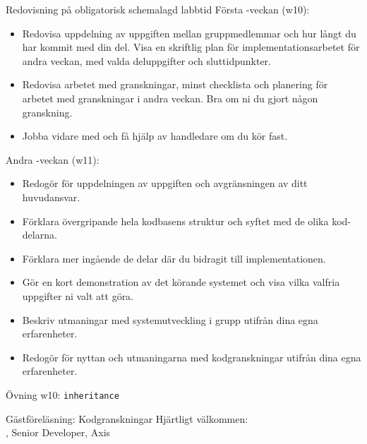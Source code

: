 \begin{Slide}{Redovisning på obligatorisk schemalagd labbtid}
Första -veckan (w10):
\begin{itemize}\SlideFontTiny
\item Redovisa uppdelning av uppgiften mellan gruppmedlemmar och hur långt du har kommit med din del. Visa en skriftlig plan för implementationsarbetet för andra veckan, med valda deluppgifter och sluttidpunkter.
\item Redovisa arbetet med granskningar, minst checklista och planering för arbetet med granskningar i andra veckan. Bra om ni du gjort någon granskning.
\item Jobba vidare med  och få hjälp av handledare om du kör fast. 
\end{itemize}
Andra -veckan (w11):
\begin{itemize}\SlideFontTiny
\item Redogör för uppdelningen av uppgiften och avgränsningen av ditt huvudansvar.
\item Förklara övergripande hela kodbasens struktur och syftet med de olika kod-delarna.
\item Förklara mer ingående de delar där du bidragit till implementationen.
\item Gör en kort demonstration av det körande systemet och visa vilka valfria uppgifter ni valt att göra.
\item Beskriv utmaningar med systemutveckling i grupp utifrån dina egna erfarenheter.
\item Redogör för nyttan och utmaningarna med kodgranskningar utifrån dina egna erfarenheter.  
\end{itemize}
\end{Slide}

\begin{Slide}{Övning w10: \texttt{inheritance}}
\begin{itemize}\SlideFontTiny

\end{itemize}
\end{Slide}



\begin{Slide}{Gästföreläsning: Kodgranskningar}
Hjärtligt välkommen: \\ , Senior Developer, Axis
\end{Slide}

\fi
